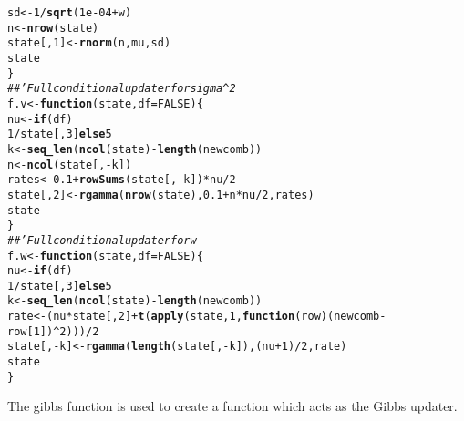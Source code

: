 \documentclass{article}\usepackage[]{graphicx}\usepackage[]{color}
\makeatletter
\newcommand{\hlnum}[1]{\textcolor[rgb]{0.686,0.059,0.569}{#1}}%
\newcommand{\hlcom}[1]{\textcolor[rgb]{0.678,0.584,0.686}{\textit{#1}}}%
\newcommand{\hlopt}[1]{\textcolor[rgb]{0,0,0}{#1}}%
\newcommand{\hlstd}[1]{\textcolor[rgb]{0.345,0.345,0.345}{#1}}%
\newcommand{\hlkwa}[1]{\textcolor[rgb]{0.161,0.373,0.58}{\textbf{#1}}}%
\newcommand{\hlkwb}[1]{\textcolor[rgb]{0.69,0.353,0.396}{#1}}%
\newcommand{\hlkwc}[1]{\textcolor[rgb]{0.333,0.667,0.333}{#1}}%
\newcommand{\hlkwd}[1]{\textcolor[rgb]{0.737,0.353,0.396}{\textbf{#1}}}%
\newenvironment{kframe}{%
 \def\at@end@of@kframe{}%
 \ifinner\ifhmode%
  \def\at@end@of@kframe{\end{minipage}}%
  \begin{minipage}{\columnwidth}%
 \fi\fi%
 \def\FrameCommand##1{\hskip\@totalleftmargin \hskip-\fboxsep
 \colorbox{shadecolor}{##1}\hskip-\fboxsep
     \hskip-\linewidth \hskip-\@totalleftmargin \hskip\columnwidth}%
 \MakeFramed {\advance\hsize-\width
   \@totalleftmargin\z@ \linewidth\hsize
   \@setminipage}}%
 {\par\unskip\endMakeFramed%
 \at@end@of@kframe}
\newenvironment{knitrout}{}{} %
\makeatother
\begin{document}
\begin{knitrout}
\begin{kframe}
\begin{alltt}
    \hlstd{sd} \hlkwb{<-} \hlnum{1}\hlopt{/}\hlkwd{sqrt}\hlstd{(}\hlnum{1e-04} \hlopt{+} \hlstd{w)}
    \hlstd{n} \hlkwb{<-} \hlkwd{nrow}\hlstd{(state)}
    \hlstd{state[,} \hlnum{1}\hlstd{]} \hlkwb{<-} \hlkwd{rnorm}\hlstd{(n, mu, sd)}
    \hlstd{state}
\hlstd{\}}
\hlcom{##' Full conditional updater for sigma^2}
\hlstd{f.v} \hlkwb{<-} \hlkwa{function}\hlstd{(}\hlkwc{state}\hlstd{,} \hlkwc{df} \hlstd{=} \hlnum{FALSE}\hlstd{) \{}
    \hlstd{nu} \hlkwb{<-} \hlkwa{if} \hlstd{(df)}
        \hlnum{1}\hlopt{/}\hlstd{state[,} \hlnum{3}\hlstd{]} \hlkwa{else} \hlnum{5}
    \hlstd{k} \hlkwb{<-} \hlkwd{seq_len}\hlstd{(}\hlkwd{ncol}\hlstd{(state)} \hlopt{-} \hlkwd{length}\hlstd{(newcomb))}
    \hlstd{n} \hlkwb{<-} \hlkwd{ncol}\hlstd{(state[,} \hlopt{-}\hlstd{k])}
    \hlstd{rates} \hlkwb{<-} \hlnum{0.1} \hlopt{+} \hlkwd{rowSums}\hlstd{(state[,} \hlopt{-}\hlstd{k])} \hlopt{*} \hlstd{nu}\hlopt{/}\hlnum{2}
    \hlstd{state[,} \hlnum{2}\hlstd{]} \hlkwb{<-} \hlkwd{rgamma}\hlstd{(}\hlkwd{nrow}\hlstd{(state),} \hlnum{0.1} \hlopt{+} \hlstd{n} \hlopt{*} \hlstd{nu}\hlopt{/}\hlnum{2}\hlstd{, rates)}
    \hlstd{state}
\hlstd{\}}
\hlcom{##' Full conditional updater for w}
\hlstd{f.w} \hlkwb{<-} \hlkwa{function}\hlstd{(}\hlkwc{state}\hlstd{,} \hlkwc{df} \hlstd{=} \hlnum{FALSE}\hlstd{) \{}
    \hlstd{nu} \hlkwb{<-} \hlkwa{if} \hlstd{(df)}
        \hlnum{1}\hlopt{/}\hlstd{state[,} \hlnum{3}\hlstd{]} \hlkwa{else} \hlnum{5}
    \hlstd{k} \hlkwb{<-} \hlkwd{seq_len}\hlstd{(}\hlkwd{ncol}\hlstd{(state)} \hlopt{-} \hlkwd{length}\hlstd{(newcomb))}
    \hlstd{rate} \hlkwb{<-} \hlstd{(nu} \hlopt{*} \hlstd{state[,} \hlnum{2}\hlstd{]} \hlopt{+} \hlkwd{t}\hlstd{(}\hlkwd{apply}\hlstd{(state,} \hlnum{1}\hlstd{,} \hlkwa{function}\hlstd{(}\hlkwc{row}\hlstd{) (newcomb} \hlopt{-} \hlstd{row[}\hlnum{1}\hlstd{])}\hlopt{^}\hlnum{2}\hlstd{)))}\hlopt{/}\hlnum{2}
    \hlstd{state[,} \hlopt{-}\hlstd{k]} \hlkwb{<-} \hlkwd{rgamma}\hlstd{(}\hlkwd{length}\hlstd{(state[,} \hlopt{-}\hlstd{k]), (nu} \hlopt{+} \hlnum{1}\hlstd{)}\hlopt{/}\hlnum{2}\hlstd{, rate)}
    \hlstd{state}
\hlstd{\}}
\end{alltt}
\end{kframe}
\end{knitrout}

The gibbs function is used to create a function which acts as the
Gibbs updater.
\end{document}
